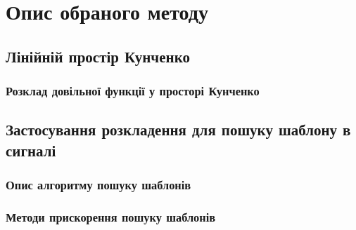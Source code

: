 \chapter{Опис обраного методу}
\section{Лінійній простір Кунченко}
\subsection{Розклад довільної функції у просторі Кунченко}

\section{Застосування розкладення для пошуку шаблону в сигналі}
\subsection{Опис алгоритму пошуку шаблонів}
\subsection{Методи прискорення пошуку шаблонів}

